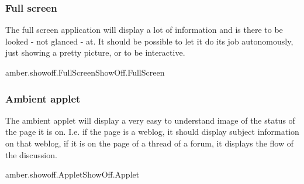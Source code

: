 \subsubsection{Full screen}

The full screen application will display a lot of information and is there to
be looked - not glanced - at. It should be possible to let it do its job
autonomously, just showing a pretty picture, or to be interactive.

\begin{module}{amber.showoff.FullScreen}{ShowOff.FullScreen}
\end{module}

\subsubsection{Ambient applet}

The ambient applet will display a very easy to understand image of the status
of the page it is on. I.e. if the page is a weblog, it should display subject
information on that weblog, if it is on the page of a thread of a forum, it
displays the flow of the discussion.

\begin{module}{amber.showoff.Applet}{ShowOff.Applet}
\end{module}

